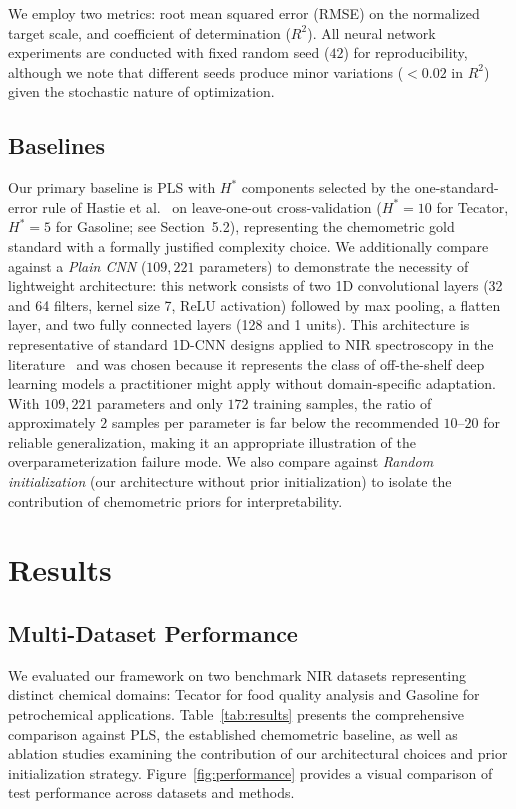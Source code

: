 \documentclass[preprint,12pt]{elsarticle}
\begin{document}
We employ two metrics: root mean squared error (RMSE) on the normalized target scale, and coefficient of determination ($R^2$). All neural network experiments are conducted with fixed random seed ($42$) for reproducibility, although we note that different seeds produce minor variations ($<0.02$ in $R^2$) given the stochastic nature of optimization.

\subsection{Baselines}

Our primary baseline is PLS  with $H^*$ components selected by the one-standard-error rule of Hastie et al.~\cite{hastie2009elements} on leave-one-out cross-validation ($H^*=10$ for Tecator, $H^*=5$ for Gasoline; see Section~5.2), representing the chemometric gold standard with a formally justified complexity choice. We additionally compare against a {\em Plain CNN} ($109,221$ parameters) to demonstrate the necessity of lightweight architecture: this network consists of two 1D convolutional layers (32 and 64 filters, kernel size 7, ReLU activation) followed by max pooling, a flatten layer, and two fully connected layers (128 and 1 units). This architecture is representative of standard 1D-CNN designs applied to NIR spectroscopy in the literature~\cite{cui2018modern} and was chosen because it represents the class of off-the-shelf deep learning models a practitioner might apply without domain-specific adaptation. With $109,221$ parameters and only $172$ training samples, the ratio of approximately $2$ samples per parameter is far below the recommended $10$--$20$ for reliable generalization, making it an appropriate illustration of the overparameterization failure mode. We also compare against {\em Random initialization} (our architecture without prior initialization) to isolate the contribution of chemometric priors for interpretability.

\section{Results}

\subsection{Multi-Dataset Performance}

We evaluated our framework on two benchmark NIR datasets representing distinct chemical domains: Tecator for food quality analysis and Gasoline for petrochemical applications. Table~\ref{tab:results} presents the comprehensive comparison against PLS, the established chemometric baseline, as well as ablation studies examining the contribution of our architectural choices and prior initialization strategy. Figure~\ref{fig:performance} provides a visual comparison of test performance across datasets and methods.
\end{document}
